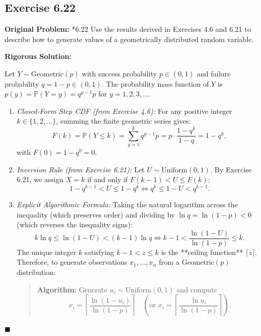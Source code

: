 \documentclass[11pt, letterpaper]{article}
\theoremstyle{definition}
\theoremstyle{remark}
\newcommand{\Prob}{\mathbb{P}}
\begin{document}
\subsection{Exercise 6.22}

\textbf{Original Problem:}
*6.22 Use the results derived in Exercises 4.6 and 6.21 to describe how to generate values of a geometrically distributed random variable.

\hrulefill

\textbf{Rigorous Solution:}

Let $Y \sim \text{Geometric}(p)$ with success probability $p \in (0, 1)$ and failure probability $q = 1 - p \in (0, 1)$. The probability mass function of $Y$ is $p(y) = \Prob(Y = y) = q^{y - 1}p$ for $y = 1, 2, 3, \dots$.
\begin{enumerate}
    \item \textit{Closed-Form Step CDF (from Exercise 4.6):} For any positive integer $k \in \{1, 2, \dots\}$, summing the finite geometric series gives:
    \[
        F(k) = \Prob(Y \le k) = \sum_{y = 1}^{k} q^{y - 1}p = p \cdot \frac{1 - q^k}{1 - q} = 1 - q^k,
    \]
    with $F(0) = 1 - q^0 = 0$.
    \item \textit{Inversion Rule (from Exercise 6.21):} Let $U \sim \text{Uniform}(0, 1)$. By Exercise 6.21, we assign $X = k$ if and only if $F(k - 1) < U \le F(k)$:
    \[
        1 - q^{k - 1} < U \le 1 - q^k \iff q^k \le 1 - U < q^{k - 1}.
    \]
    \item \textit{Explicit Algorithmic Formula:} Taking the natural logarithm across the inequality (which preserves order) and dividing by $\ln q = \ln(1 - p) < 0$ (which reverses the inequality signs):
    \[
        k \ln q \le \ln(1 - U) < (k - 1)\ln q \iff k - 1 < \frac{\ln(1 - U)}{\ln(1 - p)} \le k.
    \]
    The unique integer $k$ satisfying $k - 1 < z \le k$ is the **ceiling function** $\lceil z \rceil$. Therefore, to generate observations $x_1, \dots, x_n$ from a $\text{Geometric}(p)$ distribution:
    \begin{quote}
        \textbf{Algorithm:} Generate $u_i \sim \text{Uniform}(0, 1)$ and compute
        \[
            x_i = \left\lceil \frac{\ln(1 - u_i)}{\ln(1 - p)} \right\rceil \quad \left(\text{or } x_i = \left\lceil \frac{\ln u_i}{\ln(1 - p)} \right\rceil\right).
        \]
    \end{quote}
\end{enumerate}
\hfill $\blacksquare$
\end{document}
